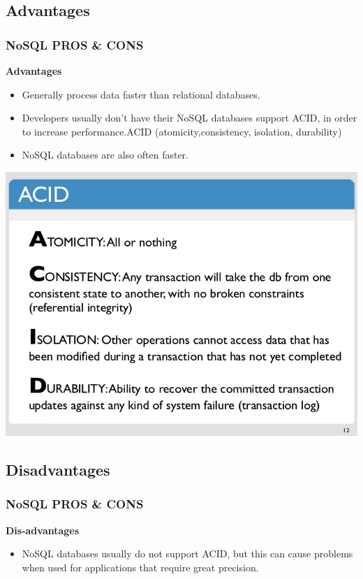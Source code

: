\documentclass{beamer}
\begin{document}
\subsection[]{Advantages}
\begin{frame}\frametitle{NoSQL PROS & CONS}
\textbf{Advantages}
\begin{itemize}
\item Generally process data faster than relational databases.
\item Developers usually don’t have their NoSQL databases support ACID, in order to increase performance.\newline ACID (atomicity,consistency, isolation, durability)
\item NoSQL databases are also often faster.
\end{itemize}
\end{frame}
\begin{frame}\newline
\includegraphics[scale=.45]{slide-20-728.jpg}
\end{frame}

\subsection[]{Disadvantages}
\begin{frame}\frametitle{NoSQL PROS & CONS}
\textbf{Dis-advantages}
\begin{itemize}
\item NoSQL databases usually do not support ACID, but this can cause problems when used for applications that require great precision.
\end{itemize}
\end{frame}
\end{document}
